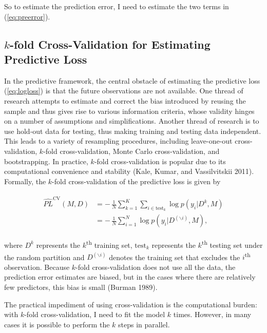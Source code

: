 So to estimate the prediction error, I need to estimate the two terms in
(\ref{eq:preerror}).

\subsection{\texorpdfstring{\(k\)-fold Cross-Validation for Estimating
Predictive
Loss}{k-fold Cross-Validation for Estimating Predictive Loss}}\label{k-fold-cross-validation-for-estimating-predictive-loss}

In the predictive framework, the central obstacle of estimating the
predictive loss (\ref{eq:logloss}) is that the future observations are
not available. One thread of research attempts to estimate and correct
the bias introduced by reusing the sample and thus gives rise to various
information criteria, whose validity hinges on a number of assumptions
and simplifications. Another thread of research is to use hold-out data
for testing, thus making training and testing data independent. This
leads to a variety of resampling procedures, including leave-one-out
cross-validation, \(k\)-fold cross-validation, Monte Carlo
cross-validation, and bootstrapping. In practice, \(k\)-fold
cross-validation is popular due to its computational convenience and
stability (Kale, Kumar, and Vassilvitskii 2011). Formally, the
\(k\)-fold cross-validation of the predictive loss is given by

\begin{align}
\begin{split}
  \label{eq:xvalesti}
  \widehat{PL}^{\text{CV}}(M, D) &=-\,\frac{1}{N}\sum_{k=1}^K\sum_{i\in
    \text{test}_k}\log p(y_i|D^k, M)\\
  &=-\,\frac{1}{N}\sum_{i=1}^N\log
  p(y_i|D^{(\backslash i)}, M),
\end{split}
\end{align}

\noindent where \(D^k\) represents the \(k\)\textsuperscript{th}
training set, \(\text{test}_k\) represents the \(k\)\textsuperscript{th}
testing set under the random partition and \(D^{(\backslash i)}\)
denotes the training set that excludes the \(i\)\textsuperscript{th}
observation. Because \(k\)-fold cross-validation does not use all the
data, the prediction error estimates are biased, but in the cases where
there are relatively few predictors, this bias is small (Burman 1989).

The practical impediment of using cross-validation is the computational
burden: with \(k\)-fold cross-validation, I need to fit the model \(k\)
times. However, in many cases it is possible to perform the \(k\) steps
in parallel.


